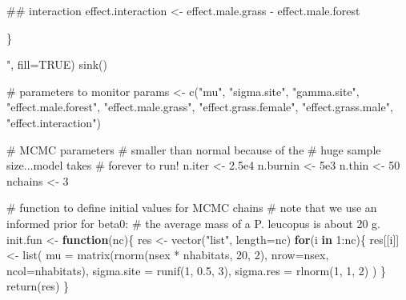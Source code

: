 \documentclass[
  13,
  letterpaper,
]{report}
\newenvironment{Shaded}{\begin{snugshade}}{\end{snugshade}}
\newcommand{\AttributeTok}[1]{\textcolor[rgb]{0.40,0.45,0.13}{#1}}
\newcommand{\CommentTok}[1]{\textcolor[rgb]{0.37,0.37,0.37}{#1}}
\newcommand{\ConstantTok}[1]{\textcolor[rgb]{0.56,0.35,0.01}{#1}}
\newcommand{\ControlFlowTok}[1]{\textcolor[rgb]{0.00,0.23,0.31}{\textbf{#1}}}
\newcommand{\DecValTok}[1]{\textcolor[rgb]{0.68,0.00,0.00}{#1}}
\newcommand{\FloatTok}[1]{\textcolor[rgb]{0.68,0.00,0.00}{#1}}
\newcommand{\FunctionTok}[1]{\textcolor[rgb]{0.28,0.35,0.67}{#1}}
\newcommand{\NormalTok}[1]{\textcolor[rgb]{0.00,0.23,0.31}{#1}}
\newcommand{\OtherTok}[1]{\textcolor[rgb]{0.00,0.23,0.31}{#1}}
\newcommand{\SpecialCharTok}[1]{\textcolor[rgb]{0.37,0.37,0.37}{#1}}
\newcommand{\StringTok}[1]{\textcolor[rgb]{0.13,0.47,0.30}{#1}}
\begin{document}
\begin{Shaded}
\begin{Highlighting}[]
\StringTok{    \#\# interaction}
\StringTok{    effect.interaction \textless{}{-} effect.male.grass {-} effect.male.forest}

\StringTok{\}}



\StringTok{"}\NormalTok{, }\AttributeTok{fill=}\ConstantTok{TRUE}\NormalTok{)}
\FunctionTok{sink}\NormalTok{()}

\CommentTok{\# parameters to monitor}
\NormalTok{params }\OtherTok{\textless{}{-}} \FunctionTok{c}\NormalTok{(}\StringTok{"mu"}\NormalTok{, }\StringTok{"sigma.site"}\NormalTok{, }\StringTok{"gamma.site"}\NormalTok{,}
            \StringTok{"effect.male.forest"}\NormalTok{, }\StringTok{"effect.male.grass"}\NormalTok{,}
            \StringTok{"effect.grass.female"}\NormalTok{, }\StringTok{"effect.grass.male"}\NormalTok{,}
            \StringTok{"effect.interaction"}\NormalTok{)}

\CommentTok{\# MCMC parameters}
\CommentTok{\# smaller than normal because of the}
\CommentTok{\# huge sample size...model takes}
\CommentTok{\# forever to run!}
\NormalTok{n.iter }\OtherTok{\textless{}{-}} \FloatTok{2.5e4}
\NormalTok{n.burnin }\OtherTok{\textless{}{-}} \FloatTok{5e3}
\NormalTok{n.thin }\OtherTok{\textless{}{-}} \DecValTok{50}
\NormalTok{nchains }\OtherTok{\textless{}{-}} \DecValTok{3}

\CommentTok{\# function to define initial values for MCMC chains}
\CommentTok{\# note that we use an informed prior for beta0:}
\CommentTok{\# the average mass of a P. leucopus is about 20 g.}
\NormalTok{init.fun }\OtherTok{\textless{}{-}} \ControlFlowTok{function}\NormalTok{(nc)\{}
\NormalTok{    res }\OtherTok{\textless{}{-}} \FunctionTok{vector}\NormalTok{(}\StringTok{"list"}\NormalTok{, }\AttributeTok{length=}\NormalTok{nc)}
    \ControlFlowTok{for}\NormalTok{(i }\ControlFlowTok{in} \DecValTok{1}\SpecialCharTok{:}\NormalTok{nc)\{}
\NormalTok{        res[[i]] }\OtherTok{\textless{}{-}} \FunctionTok{list}\NormalTok{(}
            \AttributeTok{mu =} \FunctionTok{matrix}\NormalTok{(}\FunctionTok{rnorm}\NormalTok{(nsex }\SpecialCharTok{*}\NormalTok{ nhabitats, }\DecValTok{20}\NormalTok{, }\DecValTok{2}\NormalTok{),}
                        \AttributeTok{nrow=}\NormalTok{nsex, }\AttributeTok{ncol=}\NormalTok{nhabitats),}
            \AttributeTok{sigma.site =} \FunctionTok{runif}\NormalTok{(}\DecValTok{1}\NormalTok{, }\FloatTok{0.5}\NormalTok{, }\DecValTok{3}\NormalTok{),}
            \AttributeTok{sigma.res =} \FunctionTok{rlnorm}\NormalTok{(}\DecValTok{1}\NormalTok{, }\DecValTok{1}\NormalTok{, }\DecValTok{2}\NormalTok{)}
\NormalTok{        )}
\NormalTok{    \}}
    \FunctionTok{return}\NormalTok{(res)}
\NormalTok{\}}


\end{Highlighting}
\end{Shaded}
\end{document}
